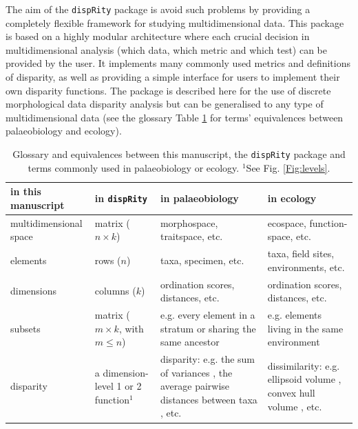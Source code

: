 \documentclass[12pt,letterpaper]{article}
\newcommand{\disp}{\texttt{dispRity} }
\begin{document}
The aim of the \disp package is avoid such problems by providing a completely flexible framework for studying multidimensional data.
This package is based on a highly modular architecture where each crucial decision in multidimensional analysis (which data, which metric and which test) can be provided by the user.
It implements many commonly used metrics and definitions of disparity, as well as providing a simple interface for users to implement their own disparity functions.
The package is described here for the use of discrete morphological data disparity analysis but can be generalised to any type of multidimensional data
(see the glossary Table \ref{Tab:terms} for terms' equivalences between palaeobiology and ecology).

\begin{landscape}
\begin{table}
    \begin{tabular}{p{4cm}p{5cm}p{6cm}p{6cm}}
        \hline
        \textbf{in this manuscript} & \textbf{in} \texttt{\textbf{dispRity}} & \textbf{in palaeobiology} & \textbf{in ecology} \\ 
        \hline
        multidimensional space & matrix ($n\times k$) & morphospace, traitspace, etc. & ecospace, function-space, etc. \\
        \hline
        elements & rows ($n$) & taxa, specimen, etc. & taxa, field sites, environments, etc. \\
        \hline
        dimensions & columns ($k$) & ordination scores, distances, etc. & ordination scores, distances, etc. \\
        \hline
        subsets & matrix ($m \times k$, with $m \leq n$) & e.g. every element in a stratum or sharing the same ancestor & e.g. elements living in the same environment \\
        \hline
        disparity & a dimension-level 1 or 2 function$^1$ & disparity: e.g. the sum of variances \cite{Wills2001}, the average pairwise distances between taxa \cite{Foote01071994}, etc. & dissimilarity: e.g. ellipsoid volume \cite{DonohueDim}, convex hull volume \cite{cornwell2006trait}, etc. \\
        \hline
    \end{tabular}
    \caption{Glossary and equivalences between this manuscript, the \texttt{dispRity} package and terms commonly used in palaeobiology or ecology. $^1$See Fig. \ref{Fig:levels}.}
    \label{Tab:terms}
\end{table}
\end{landscape}
\end{document}
